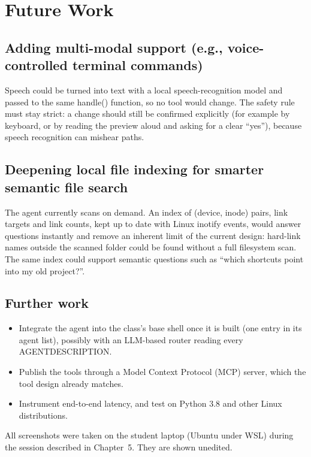 \documentclass[12pt,a4paper]{article}
\newcommand{\chapterheading}[1]{\par\vspace{0.8em}{\noindent\Large\bfseries #1\par}\vspace{0.5em}}
\DeclareRobustCommand{\code}[1]{{\ttfamily\renewcommand{\_}{\textunderscore\allowbreak}#1}}
\begin{document}
\section{Future Work}
\subsection{Adding multi-modal support (e.g., voice-controlled terminal commands)}
Speech could be turned into text with a local speech-recognition model and passed to the same
\code{handle()} function, so no tool would change. The safety rule must stay strict: a change
should still be confirmed explicitly (for example by keyboard, or by reading the preview aloud
and asking for a clear ``yes''), because speech recognition can mishear paths.

\subsection{Deepening local file indexing for smarter semantic file search}
The agent currently scans on demand. An index of (device, inode) pairs, link targets and link
counts, kept up to date with Linux \code{inotify} events, would answer questions instantly and
remove an inherent limit of the current design: hard-link names outside the scanned folder could
be found without a full filesystem scan. The same index could support semantic questions such as
``which shortcuts point into my old project?''.

\subsection{Further work}
\begin{itemize}
  \item Integrate the agent into the class's base shell once it is built (one entry in its agent
        list), possibly with an LLM-based router reading every \code{AGENT\_DESCRIPTION}.
  \item Publish the tools through a Model Context Protocol (MCP) server, which the tool design
        already matches.
  \item Instrument end-to-end latency, and test on Python 3.8 and other Linux distributions.
\end{itemize}

\clearpage
\chapterheading{Chapter 7: Screenshots}
All screenshots were taken on the student laptop (Ubuntu under WSL) during the session described
in Chapter~5. They are shown unedited.
\end{document}

